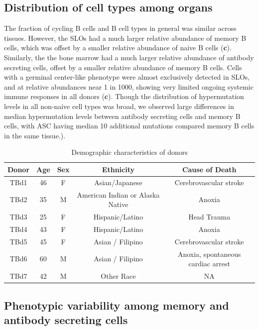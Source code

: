 \subsection{Distribution of cell types among organs}
The fraction of cycling B cells and B cell types in general was similar across tissues. However, the SLOs had a much larger relative abundance of memory B cells, which was offset by a smaller relative abundance of naive B cells (\textbf{c}). Similarly, the the bone marrow had a much larger relative abundance of antibody secreting cells, offset by a smaller relative abundance of memory B cells. Cells with a germinal center-like phenotype were almost exclusively detected in SLOs, and at relative abundances near 1 in 1000, showing very limited ongoing systemic immune responses in all donors  (\textbf{c}). Though the distribution of hypermutation levels in all  non-naive cell types was broad, we observed large differences in median hypermutation levels between antibody secreting cells and memory B cells, with ASC having median 10 additional mutations compared memory B cells in the same tissue.).   

\begin{table}[t]
\centering

\begin{tabular}{|c|c|c|c|c|}
\hline
\textbf{Donor} & \textbf{Age} & \textbf{Sex} & \textbf{Ethnicity} & \textbf{Cause of Death} \\
\hline
TBd1 & 46 & F & Asian/Japanese & Cerebrovascular stroke \\
TBd2 & 35 & M & American Indian or Alaska Native & Anoxia \\
TBd3 & 25 & F & Hispanic/Latino & Head Trauma \\
TBd4 & 43 & F & Hispanic/Latino & Anoxia \\
TBd5 & 45 & F & Asian / Filipino & Cerebrovascular stroke  \\
TBd6 & 60 & M & Asian / Filipino & Anoxia, spontaneous cardiac arrest \\
TBd7 & 42 & M & Other Race & NA \\
\hline
\end{tabular}
    \caption{Demographic characteristics of  donors }

    \label{tbl:donor-metadata}
\end{table}

\subsection{Phenotypic variability among memory and antibody secreting cells}




